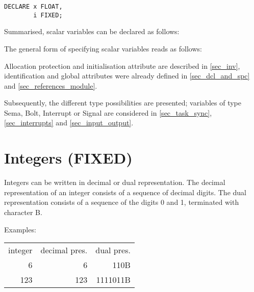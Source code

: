 \begin{lstlisting}
DECLARE x FLOAT,
        i FIXED;
\end{lstlisting}

Summarised, scalar variables can be declared as follows:

\begin{grammarframe}




\end{grammarframe}

The general form of specifying scalar variables reads as follows:

\begin{grammarframe}

\end{grammarframe}

Allocation protection and initialisation attribute are described in 
\ref{sec_inv},
identification and global attributes were already defined
in \ref{sec_dcl_and_spc} and \ref{sec_references_module}.

Subsequently, the different type possibilities are presented; variables
of type Sema, Bolt, Interrupt or Signal are considered in 
\ref{sec_task_sync}, \ref{sec_interrupts} and
\ref{sec_input_output}.

\section{Integers (FIXED)}   %
\label{sec_type_fixed}

Integers can be written in decimal or dual representation. The decimal
representation of an integer consists of a sequence of decimal digits. The dual
representation consists of a sequence of the digits 0 and 1, terminated
with character B.

Examples:

\begin{tabular}{rrr}
integer & decimal pres. & dual pres. \\
      6 &             6 &     110B \\
    123 &           123 & 1111011B
\end{tabular}

